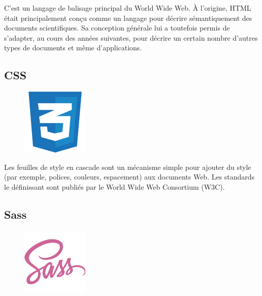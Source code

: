 C'est un langage de balisage principal du World Wide Web. À l'origine, HTML 
était principalement conçu comme un langage pour décrire sémantiquement des 
documents scientifiques. Sa conception générale lui a toutefois permis de 
s’adapter, au cours des années suivantes, pour décrire un certain nombre 
d’autres types de documents et même d’applications\cite{14}.

\subsection{CSS}
\begin{figure}
    \vspace{-22pt}
    \begin{center}
        \includegraphics[scale=0.36]{images/logo/css.png}
        \label{fig71}
    \end{center}
    \vspace{-20pt}
    \vspace{-10pt}
\end{figure}

Les feuilles de style en cascade sont un mécanisme simple pour ajouter du style 
(par exemple, polices, couleurs, espacement) aux documents Web. Les standards le 
définissant sont publiés par le World Wide Web Consortium (W3C)\cite{15}.

\subsection{Sass}
\begin{figure}
    \vspace{-22pt}
    \begin{center}
        \includegraphics[scale=0.36]{images/logo/sass.png}
        \label{fig72}
    \end{center}
    \vspace{-20pt}
    \vspace{-10pt}
\end{figure}

